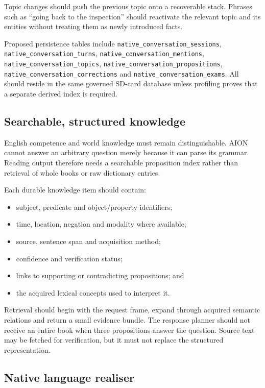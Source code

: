 \documentclass[11pt,a4paper]{article}
\begin{document}
Topic changes should push the previous topic onto a recoverable stack.  Phrases such as ``going
back to the inspection'' should reactivate the relevant topic and its entities without treating
them as newly introduced facts.

Proposed persistence tables include
\texttt{native\_conversation\_sessions},
\texttt{native\_conversation\_turns},
\texttt{native\_conversation\_mentions},
\texttt{native\_conversation\_topics},
\texttt{native\_conversation\_propositions},
\texttt{native\_conversation\_corrections} and
\texttt{native\_conversation\_exams}.  All should reside in the same governed SD-card database
unless profiling proves that a separate derived index is required.

\subsection{Searchable, structured knowledge}

English competence and world knowledge must remain distinguishable.  AION cannot answer an
arbitrary question merely because it can parse its grammar.  Reading output therefore needs a
searchable proposition index rather than retrieval of whole books or raw dictionary entries.

Each durable knowledge item should contain:

\begin{itemize}
  \item subject, predicate and object/property identifiers;
  \item time, location, negation and modality where available;
  \item source, sentence span and acquisition method;
  \item confidence and verification status;
  \item links to supporting or contradicting propositions; and
  \item the acquired lexical concepts used to interpret it.
\end{itemize}

Retrieval should begin with the request frame, expand through acquired semantic relations and
return a small evidence bundle.  The response planner should not receive an entire book when three
propositions answer the question.  Source text may be fetched for verification, but it must not
replace the structured representation.

\subsection{Native language realiser}
\end{document}
